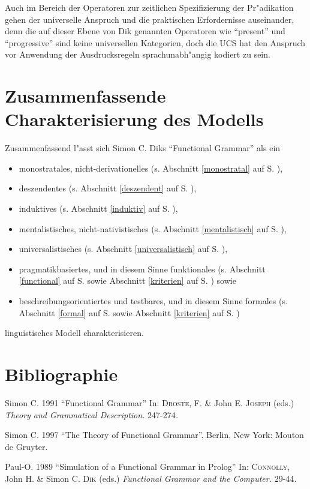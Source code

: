 \documentclass[a4paper]{article}
\newcommand{\noun}[1]{\textsc{#1}}
\begin{document}
Auch im Bereich der Operatoren zur zeitlichen Spezifizierung der Pr"adikation
gehen der universelle Anspruch und die praktischen Erfordernisse auseinander,
denn die auf dieser Ebene von Dik genannten Operatoren wie ``present'' und
``progressive'' sind keine universellen Kategorien, doch die UCS hat den
Anspruch vor Anwendung der Ausdrucksregeln sprachunabh"angig kodiert zu sein.

\section{Zusammenfassende Charakterisierung des Modells}

Zusammenfassend l"asst sich Simon C. Diks ``Functional Grammar'' als ein

\begin{itemize}
  \item{monostratales, nicht-derivationelles (s. Abschnitt \ref{monostratal} auf S. \pageref{monostratal})},
  \item{deszendentes (s. Abschnitt \ref{deszendent} auf S. \pageref{deszendent})},
  \item {induktives (s. Abschnitt \ref{induktiv} auf S. \pageref{induktiv})},
  \item {mentalistisches, nicht-nativistisches (s. Abschnitt \ref{mentalistisch} auf S. \pageref{mentalistisch})},
  \item {universalistisches (s. Abschnitt \ref{universalistisch} auf S. \pageref{universalistisch})},
  \item {pragmatikbasiertes, und in diesem Sinne funktionales (s. Abschnitt
  \ref{functional} auf S. \pageref{functional} sowie Abschnitt \ref{kriterien} auf S. \pageref{kriterien})} sowie
  \item {beschreibungsorientiertes und testbares, und in diesem Sinne formales (s. Abschnitt \ref{formal} auf S. \pageref{formal} sowie Abschnitt \ref{kriterien} auf S. \pageref{kriterien})}
\end{itemize}

linguistisches Modell charakterisieren.

\section*{Bibliographie}

\begin{description}
\item [\textmd{\noun{Dik}}\textmd{,}]Simon C. 1991 {}``Functional Grammar'' In:
\noun{Droste}, F. \& John E. \noun{Joseph} (eds.) \emph{Theory and Grammatical
Description.} 247-274\emph{.}
\item [\textmd{\noun{Dik}}\textmd{,}]Simon C. 1997 {}``The Theory of Functional
Grammar''. Berlin, New York: Mouton de Gruyter.
\item [\textmd{\noun{Samuelsdorff}}\textmd{,}]Paul-O. 1989 {}``Simulation of a
Functional Grammar in Prolog'' In: \noun{Connolly}, John H. \& Simon C.
\noun{Dik} (eds.) \emph{Functional Grammar and the Computer.} 29-44\emph{.}\item
\end{description}
\end{document}

